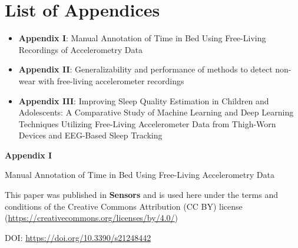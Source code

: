 \documentclass[
  10pt,
]{scrbook}
\let\originaltextbf\textbf
\renewcommand{\textbf}[1]{\textcolor{color1}{\textsf{\originaltextbf{#1}}}}
\begin{document}
\hypertarget{list-of-appendices}{%
\chapter{List of Appendices}\label{list-of-appendices}}

\begin{itemize}
\item
  \textbf{Appendix I}: Manual Annotation of Time in Bed Using
  Free-Living Recordings of Accelerometry Data
\item
  \textbf{Appendix II}: Generalizability and performance of methods to
  detect non-wear with free-living accelerometer recordings
\item
  \textbf{Appendix III}: Improving Sleep Quality Estimation in Children
  and Adolescents: A Comparative Study of Machine Learning and Deep
  Learning Techniques Utilizing Free-Living Accelerometer Data from
  Thigh-Worn Devices and EEG-Based Sleep Tracking
\end{itemize}

\newpage

\begin{center}

\textbf{\textsf{\Huge Appendix I}}



\vspace{2cm}

\textsf{\Huge Manual Annotation of Time in Bed Using Free-Living Accelerometry Data}

\vspace{5cm}

This paper was published in \textbf{Sensors} and is used here under the terms and conditions of the Creative Commons Attribution (CC BY) license (\href{https://creativecommons.org/licenses/by/4.0/}{https://creativecommons.org/licenses/by/4.0/})

\vspace{1cm}

DOI: \href{https://doi.org/10.3390/s21248442}{https://doi.org/10.3390/s21248442}

\end{center}


\end{document}
